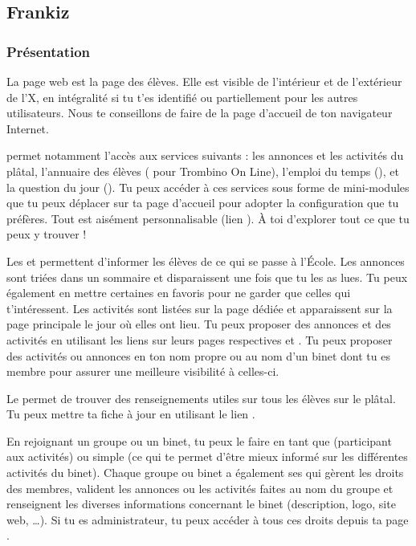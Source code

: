 \subsection{Frankiz}


\subsubsection{Présentation}

\label{frankiz} La page web \fkz est la page des élèves. Elle est visible de l'intérieur et de
l'extérieur de l'X, en intégralité si tu t'es identifié ou partiellement pour les autres
utilisateurs. Nous te conseillons de faire de  la page d'accueil de ton navigateur Internet.

\fkz permet notamment l'accès aux services suivants : les
annonces et les activités du plâtal, l'annuaire des élèves
( pour Trombino On Line), l'emploi du temps (), et la question du jour (). Tu peux accéder à ces services sous forme de mini-modules que tu peux déplacer sur ta page d'accueil pour adopter la configuration que tu préfères.
Tout est aisément personnalisable (lien ). À toi d'explorer tout ce que tu peux y trouver !

Les  et  permettent d'informer les élèves de ce qui se passe à  l'École. Les annonces sont triées dans
un sommaire et disparaissent une fois que tu les as lues. Tu peux également en mettre certaines en favoris pour ne garder que celles qui t'intéressent. Les activités sont listées sur la page dédiée et apparaissent
sur la page principale le jour où elles ont lieu. Tu peux proposer des annonces et des activités en utilisant les liens sur leurs pages respectives  et . Tu peux proposer des activités ou annonces en ton nom propre ou au nom d'un binet dont tu es membre pour assurer une meilleure visibilité à celles-ci.

Le  permet de trouver des renseignements utiles sur
tous les élèves sur le plâtal. Tu peux mettre ta fiche à  jour en
utilisant le lien .

En rejoignant un groupe ou un binet, tu peux le faire en tant que  (participant aux activités) ou simple  (ce qui te permet d'être mieux informé sur les différentes activités du binet). Chaque groupe ou binet a également ses  qui gèrent les droits des membres, valident les annonces ou les activités faites au nom du groupe et renseignent les diverses informations concernant le binet (description, logo, site web, \dots). Si tu es administrateur, tu peux accéder à tous ces droits depuis ta page .

